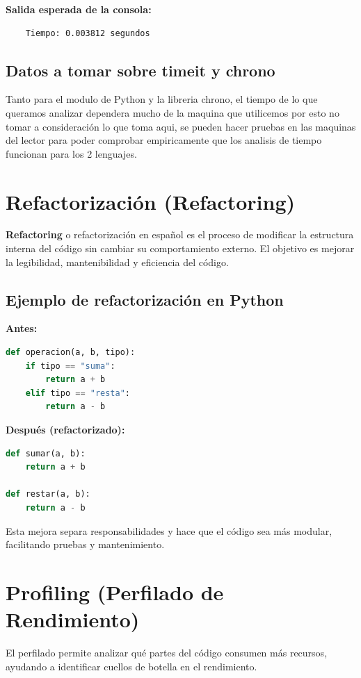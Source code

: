 \documentclass[12pt]{article}
\begin{document}
\textbf{Salida esperada de la consola:}

\begin{lstlisting}
    Tiempo: 0.003812 segundos
\end{lstlisting}

\subsection*{Datos a tomar sobre timeit y chrono}
Tanto para el modulo de Python y la libreria chrono, el tiempo de lo que queramos analizar dependera mucho de la maquina que utilicemos por esto no tomar a consideración lo que toma aqui, se pueden hacer pruebas en las maquinas del lector para poder comprobar empiricamente que los analisis de tiempo funcionan para los 2 lenguajes.

\section{Refactorización (Refactoring)}

\textbf{Refactoring} o refactorización en español es el proceso de modificar la estructura interna del código sin cambiar su comportamiento externo. El objetivo es mejorar la legibilidad, mantenibilidad y eficiencia del código.

\subsection*{Ejemplo de refactorización en Python}

\textbf{Antes:}
\begin{lstlisting}[language=Python]
def operacion(a, b, tipo):
    if tipo == "suma":
        return a + b
    elif tipo == "resta":
        return a - b
\end{lstlisting}

\textbf{Después (refactorizado):}
\begin{lstlisting}[language=Python]
def sumar(a, b):
    return a + b

def restar(a, b):
    return a - b
\end{lstlisting}

Esta mejora separa responsabilidades y hace que el código sea más modular, facilitando pruebas y mantenimiento.
\section{Profiling (Perfilado de Rendimiento)}
El perfilado permite analizar qué partes del código consumen más recursos, ayudando a identificar cuellos de botella en el rendimiento.
\end{document}
